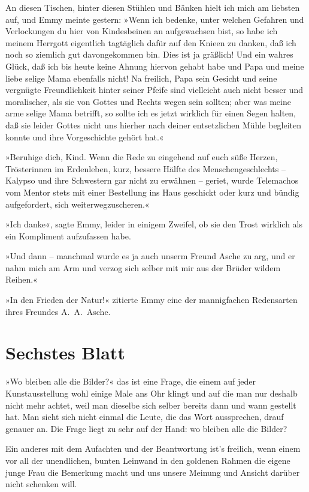 An diesen Tischen, hinter diesen Stühlen und Bänken hielt ich mich
am liebsten auf, und Emmy meinte gestern: »Wenn ich bedenke, unter
welchen Gefahren und Verlockungen du hier von Kindesbeinen an
aufgewachsen bist, so habe ich meinem Herrgott eigentlich
tagtäglich dafür auf den Knieen zu danken, daß ich noch so ziemlich
gut davongekommen bin. Dies ist ja gräßlich! Und ein wahres Glück,
daß ich bis heute keine Ahnung hiervon gehabt habe und Papa und
meine liebe selige Mama ebenfalls nicht! Na freilich, Papa sein
Gesicht und seine vergnügte Freundlichkeit hinter seiner Pfeife
sind vielleicht auch nicht besser und moralischer, als sie von
Gottes und Rechts wegen sein sollten; aber was meine arme selige
Mama betrifft, so sollte ich es jetzt wirklich für einen Segen
halten, daß sie leider Gottes nicht uns hierher nach deiner
entsetzlichen Mühle begleiten konnte und ihre Vorgeschichte gehört
hat.«

»Beruhige dich, Kind. Wenn die Rede zu eingehend auf euch süße
Herzen, Trösterinnen im Erdenleben, kurz, bessere Hälfte des
Menschengeschlechts – Kalypso und ihre Schwestern gar nicht zu
erwähnen – geriet, wurde Telemachos vom Mentor stets mit einer
Bestellung ins Haus geschickt oder kurz und bündig aufgefordert,
sich weiterwegzuscheren.«

»Ich danke«, sagte Emmy, leider in einigem Zweifel, ob sie den
Trost wirklich als ein Kompliment aufzufassen habe.

»Und dann – manchmal wurde es ja auch unserm Freund Asche zu arg,
und er nahm mich am Arm und verzog sich selber mit mir aus der
Brüder wildem Reihen.«

»In den Frieden der Natur!« zitierte Emmy eine der mannigfachen
Redensarten ihres Freundes A.~A.~Asche.

\section{Sechstes Blatt}

»Wo bleiben alle die Bilder?« das ist eine Frage, die einem auf
jeder Kunstausstellung wohl einige Male ans Ohr klingt und auf die
man nur deshalb nicht mehr achtet, weil man dieselbe sich selber
bereits dann und wann gestellt hat. Man sieht sich nicht einmal die
Leute, die das Wort aussprechen, drauf genauer an. Die Frage liegt
zu sehr auf der Hand: wo bleiben alle die Bilder?

Ein anderes mit dem Aufachten und der Beantwortung ist's freilich,
wenn einem vor all der unendlichen, bunten Leinwand in den goldenen
Rahmen die eigene junge Frau die Bemerkung macht und uns unsere
Meinung und Ansicht darüber nicht schenken will.

